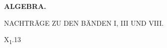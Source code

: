 \NoSourceHead
{}
\vspace*{.25\textheight}
\begin{center}\Large\bfseries ALGEBRA.\end{center}
\bigskip
\begin{center}\large NACHTRÄGE ZU DEN BÄNDEN I, III UND VIII.\end{center}
\vfill\noindent X\textsubscript{1}.\hfill 13
\clearpage
{}
